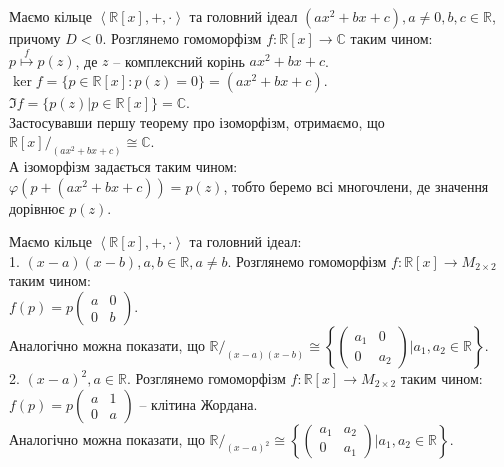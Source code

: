 \documentclass{math_library}
\begin{document}
\begin{example}
Маємо кільце $\left< \mathbb{R}[x],+,\cdot \right>$ та головний ідеал $(ax^2+bx+c), a \neq 0,b,c \in \mathbb{R}$, причому $D < 0$. Розглянемо гомоморфізм $f \colon \mathbb{R}[x] \to \mathbb{C}$ таким чином:\\
$p \overset{f}{\mapsto} p(z)$, де $z$ -- комплексний корінь $ax^2+bx+c$.\\
$\ker f = \{ p \in \mathbb{R}[x]: p(z) = 0 \} = (ax^2+bx+c)$.\\
$\Im f = \{ p(z) | p \in \mathbb{R}[x] \} = \mathbb{C}$.\\
Застосувавши першу теорему про ізоморфізм, отримаємо, що \\ $\mathbb{R}[x]/_{(ax^2+bx+c)} \cong \mathbb{C}$.\\
А ізоморфізм задається таким чином:\\
$\varphi(p + (ax^2+bx+c)) = p(z)$, тобто беремо всі многочлени, де значення дорівнює $p(z)$.
\end{example}

\begin{example}
Маємо кільце $\left< \mathbb{R}[x],+,\cdot \right>$ та головний ідеал: \\ 
1. $(x-a)(x-b), a,b \in \mathbb{R}, a \neq b$. Розглянемо гомоморфізм $f \colon \mathbb{R}[x] \to M_{2 \times 2}$ таким чином:\\
$f(p) = p \begin{pmatrix}
a & 0 \\
0 & b
\end{pmatrix}$.\\
Аналогічно можна показати, що $\mathbb{R}/_{(x-a)(x-b)} \cong \left\{ \begin{pmatrix}
a_1 & 0 \\
0 & a_2
\end{pmatrix} | a_1,a_2 \in \mathbb{R} \right\}$.
\bigskip \\
2. $(x-a)^2, a \in \mathbb{R}$. Розглянемо гомоморфізм $f: \mathbb{R}[x] \to M_{2 \times 2}$ таким чином:\\
$f(p) = p \begin{pmatrix}
a & 1 \\
0 & a
\end{pmatrix}$ -- клітина Жордана.\\
Аналогічно можна показати, що $\mathbb{R}/_{(x-a)^2} \cong \left\{ \begin{pmatrix}
a_1 & a_2 \\
0 & a_1
\end{pmatrix} | a_1,a_2 \in \mathbb{R} \right\}$.
\end{example}
\end{document}
